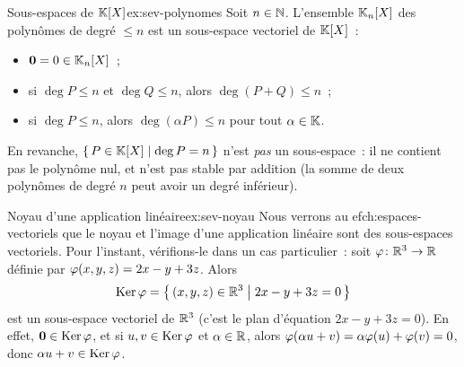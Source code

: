 \begin{center}
\label{fig:sev-R3}
\end{center}

\begin{example}{Sous-espaces de ${\mathbb{K}}[X]$}{ex:sev-polynomes}
  Soit $n\in{\mathbb{N}}$. L'ensemble ${\mathbb{K}}_n[X]$ des polynômes de degré $\leq n$
  est un sous-espace vectoriel de ${\mathbb{K}}[X]$~:
  \begin{itemize}
    \item $\mathbf{0} = 0\in{\mathbb{K}}_n[X]$~;
    \item si $\deg P\leq n$ et $\deg Q\leq n$, alors
      $\deg(P+Q)\leq n$~;
    \item si $\deg P\leq n$, alors $\deg(\alpha P)\leq n$ pour tout
      $\alpha\in{\mathbb{K}}$.
  \end{itemize}
  En revanche, $\left\{\,P\in{\mathbb{K}}[X]\;\middle|\;\deg P = n\,\right\}$ n'est \emph{pas} un
  sous-espace~: il ne contient pas le polynôme nul, et n'est pas stable
  par addition (la somme de deux polynômes de degré $n$ peut avoir un
  degré inférieur).
\end{example}

\begin{example}{Noyau d'une application linéaire}{ex:sev-noyau}
  Nous verrons au 
ef{ch:espaces-vectoriels} que le noyau et l'image
  d'une application linéaire sont des sous-espaces vectoriels. Pour
  l'instant, vérifions-le dans un cas particulier~: soit
  $\varphi\colon{\mathbb{R}}^3\to{\mathbb{R}}$ définie par $\varphi(x,y,z)=2x-y+3z$. Alors
  \[
    \operatorname{Ker}\varphi = \left\{\,(x,y,z)\in{\mathbb{R}}^3\;\middle|\;2x-y+3z=0\,\right\}
  \]
  est un sous-espace vectoriel de ${\mathbb{R}}^3$ (c'est le plan
  d'équation $2x-y+3z=0$). En effet, $\mathbf{0}\in\operatorname{Ker}\varphi$, et si
  $u,v\in\operatorname{Ker}\varphi$ et $\alpha\in{\mathbb{R}}$, alors
  $\varphi(\alpha u+v)=\alpha\varphi(u)+\varphi(v)=0$, donc
  $\alpha u+v\in\operatorname{Ker}\varphi$.
\end{example}

